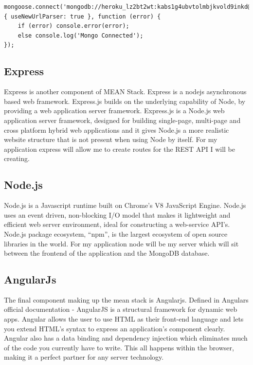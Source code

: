 \begin{verbatim}
mongoose.connect('mongodb://heroku_lz2bt2wt:kabs1g4ubvtolmbjkvold9inkd@ds227185.mlab.com:27185/heroku_lz2bt2wt',{ useNewUrlParser: true }, function (error) {
    if (error) console.error(error);
    else console.log('Mongo Connected');
});
\end{verbatim}


\subsection{Express}
Express is another component of MEAN Stack. Express is a nodejs asynchronous based web framework. Express.js builds on the underlying capability of Node, by providing a web application server framework. Express.js is a Node.js web application server framework, designed for building single-page, multi-page and cross platform hybrid web applications and it gives Node.js a more realistic website structure that is not present when using Node by itself. For my application express will allow me to create routes for the REST API I will be creating.\cite{expressjs}
\subsection{Node.js}

Node.js is a Javascript runtime built on Chrome’s V8 JavaScript Engine.
Node.js uses an event driven, non-blocking I/O model that makes it lightweight
and efficient web server environment, ideal for constructing a web-service
API’s. Node.js package ecosystem, “npm”, is the largest ecosystem of open
source libraries in the world. For my application node will be my server which will sit between the frontend of the application and the MongoDB database.\cite{nodejs}

\subsection{AngularJs}
The final component making up the mean stack is Angularjs. Defined in Angulars official documentation\cite{angularjs} - AngularJS is a structural framework for dynamic
web apps. Angular allows the user to use HTML as their front-end language and lets you extend HTML’s syntax to express an application’s component clearly. Angular also has a data binding and dependency injection which eliminates much
of the code you currently have to write. This all happens within the
browser, making it a perfect partner for any server technology.

